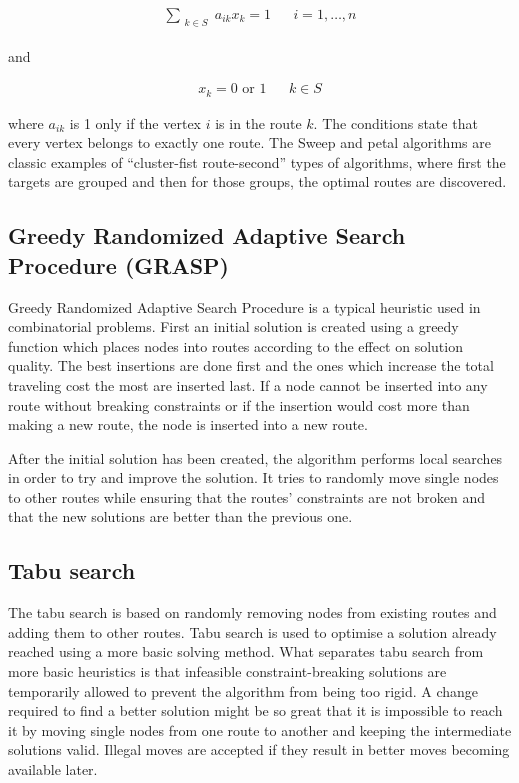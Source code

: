 \begin{equation}
\begin{aligned}
\label{eq:petal2}
\displaystyle\sum_{\substack{k \in S}} a_{ik}x_k = 1 && i = 1, \ldots, n
\end{aligned}
\end{equation}

\noindent
and

\begin{equation}
\begin{aligned}
\label{eq:petal3}
x_{k} = 0 \text{ or } 1 && k \in S
\end{aligned}
\end{equation}

where $a_{ik}$ is 1 only if the vertex $i$ is in the route $k$. \cite{laporte2000classical} The conditions state that every vertex belongs to exactly one route. The Sweep and petal algorithms are classic examples of ``cluster-fist route-second'' types of algorithms, where first the targets are grouped and then for those groups, the optimal routes are discovered. 


\subsection{Greedy Randomized Adaptive Search Procedure (GRASP)}

Greedy Randomized Adaptive Search Procedure is a typical heuristic used in combinatorial problems. First an initial solution is created using a greedy function which places nodes into routes according to the effect on solution quality. The best insertions are done first and the ones which increase the total traveling cost the most are inserted last. If a node cannot be inserted into any route without breaking constraints or if the insertion would cost more than making a new route, the node is inserted into a new route. \cite{kontoravdis1995grasp}

After the initial solution has been created, the algorithm performs local searches in order to try and improve the solution. It tries to randomly move single nodes to other routes while ensuring that the routes' constraints are not broken and that the new solutions are better than the previous one. \cite{kontoravdis1995grasp}


\subsection{Tabu search}

The tabu search is based on randomly removing nodes from existing routes and adding them to other routes. Tabu search is used to optimise a solution already reached using a more basic solving method. What separates tabu search from more basic heuristics is that infeasible constraint-breaking solutions are temporarily allowed to prevent the algorithm from being too rigid. A change required to find a better solution might be so great that it is impossible to reach it by moving single nodes from one route to another and keeping the intermediate solutions valid. Illegal moves are accepted if they result in better moves becoming available later. \cite{gendreau1994tabu}


